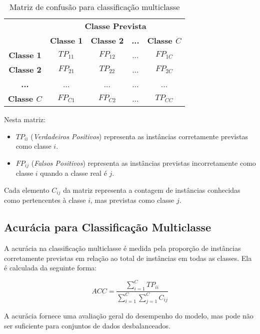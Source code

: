 \begin{table}[h]
\centering
\caption{Matriz de confusão para classificação multiclasse}
\label{tab:confusion_matrix_multiclass}
\begin{tabular}{c|c|c|c|c}
\multicolumn{1}{c}{} & \multicolumn{4}{c}{\textbf{Classe Prevista}} \\ \cline{2-5} 
\multicolumn{1}{c|}{} & \textbf{Classe 1} & \textbf{Classe 2} & \textbf{...} & \textbf{Classe \(C\)} \\ \hline
\textbf{Classe 1} & \(TP_{11}\) & \(FP_{12}\) & ... & \(FP_{1C}\) \\ \hline
\textbf{Classe 2} & \(FP_{21}\) & \(TP_{22}\) & ... & \(FP_{2C}\) \\ \hline
\textbf{...} & ... & ... & ... & ... \\ \hline
\textbf{Classe \(C\)} & \(FP_{C1}\) & \(FP_{C2}\) & ... & \(TP_{CC}\) \\ \hline
\end{tabular}
\end{table}

Nesta matriz:
\begin{itemize}
    \item \(TP_{ii}\) (\textit{Verdadeiros Positivos}) representa as instâncias corretamente previstas como classe \(i\).
    \item \(FP_{ij}\) (\textit{Falsos Positivos}) representa as instâncias previstas incorretamente como classe \(i\) quando a classe real é \(j\).
\end{itemize}

Cada elemento \(C_{ij}\) da matriz representa a contagem de instâncias conhecidas como pertencentes à classe \(i\), mas previstas como classe \(j\).


\subsection{Acurácia para Classificação Multiclasse}

A acurácia na classificação multiclasse é medida pela proporção de instâncias corretamente previstas em relação ao total de instâncias em todas as classes. Ela é calculada da seguinte forma:

\[
ACC = \frac{\sum_{i=1}^{C} TP_{ii}}{\sum_{i=1}^{C} \sum_{j=1}^{C} C_{ij}}
\]

A acurácia fornece uma avaliação geral do desempenho do modelo, mas pode não ser suficiente para conjuntos de dados desbalanceados.



